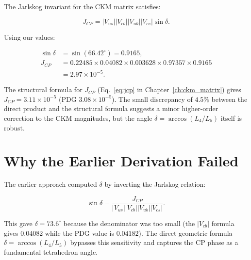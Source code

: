 The Jarlskog invariant for the CKM matrix satisfies:

\[
J_{CP} = |V_{us}||V_{cb}||V_{ub}||V_{cs}|\sin\delta.
\]

Using our values:

\[
\begin{aligned}
\sin\delta &= \sin(66.42^\circ) = 0.9165, \\
J_{CP} &= 0.22485 \times 0.04082 \times 0.003628
          \times 0.97357 \times 0.9165 \\
       &= 2.97 \times 10^{-5}.
\end{aligned}
\]

The structural formula for \(J_{CP}\) (Eq.~\eqref{eq:jcp} in
Chapter~\ref{ch:ckm_matrix}) gives \(J_{CP} = 3.11 \times 10^{-5}\)
(PDG \(3.08 \times 10^{-5}\)).
The small discrepancy of \(4.5\%\) between the direct product and the
structural formula suggests a minor higher-order correction to the
CKM magnitudes, but the angle \(\delta = \arccos(L_4/L_5)\) itself is
robust.

\section{Why the Earlier Derivation Failed}

The earlier approach computed \(\delta\) by inverting the Jarlskog
relation:

\[
\sin\delta = \frac{J_{CP}}{|V_{us}||V_{cb}||V_{ub}||V_{cs}|}.
\]

This gave \(\delta = 73.6^\circ\) because the denominator was too small
(the \(|V_{cb}|\) formula gives \(0.04082\) while the PDG value is
\(0.04182\)).  The direct geometric formula \(\delta = \arccos(L_4/L_5)\)
bypasses this sensitivity and captures the CP phase as a fundamental
tetrahedron angle.
